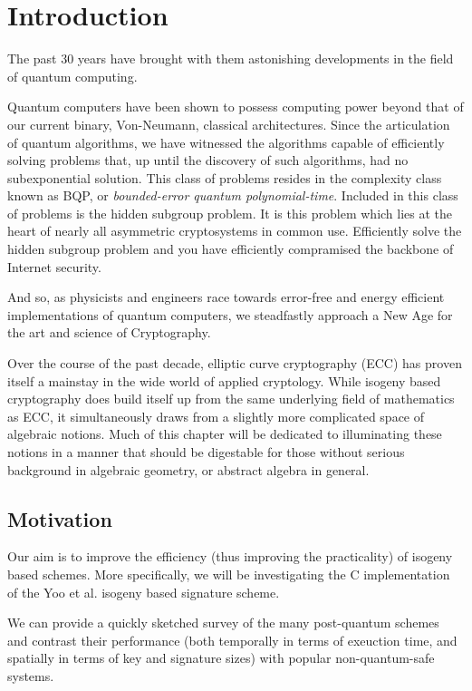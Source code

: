 \chapter{Introduction}

The past 30 years have brought with them astonishing developments in the field of quantum computing.

Quantum computers have been shown to possess computing power beyond that of our current binary, Von-Neumann, classical architectures. Since the articulation of quantum algorithms, we have witnessed the  algorithms capable of efficiently solving problems that, up until the discovery of such algorithms, had no subexponential solution. This class of problems resides in the complexity class known as BQP, or \textit{bounded-error quantum polynomial-time}. Included in this class of problems is the hidden subgroup problem. It is this problem which lies at the heart of nearly all asymmetric cryptosystems in common use. Efficiently solve the hidden subgroup problem and you have efficiently compramised the backbone of Internet security.  

And so, as physicists and engineers race towards error-free and energy efficient implementations of quantum computers, we steadfastly approach a New Age for the art and science of Cryptography. 

Over the course of the past decade, elliptic curve cryptography (ECC) has proven itself a mainstay in the wide world of applied cryptology. While isogeny based cryptography does build itself up from the same underlying field of mathematics as ECC, it simultaneously draws from a slightly more complicated space of algebraic notions. Much of this chapter will be dedicated to illuminating these notions in a manner that should be digestable for those without serious background in algebraic geometry, or abstract algebra in general.


\section{Motivation}

Our aim is to improve the efficiency (thus improving the practicality) of isogeny based schemes. More specifically, we will be investigating the C implementation of the Yoo et al. isogeny based signature scheme. 

We can provide a quickly sketched survey of the many post-quantum schemes and contrast their performance (both temporally in terms of exeuction time, and spatially in terms of key and signature sizes) with popular non-quantum-safe systems.


